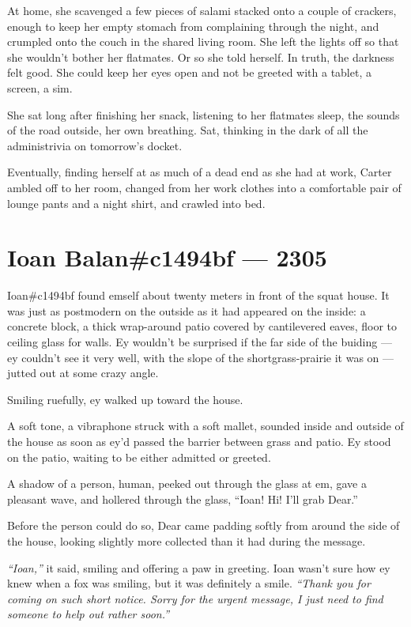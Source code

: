 At home, she scavenged a few pieces of salami stacked onto a couple of crackers, enough to keep her empty stomach from complaining through the night, and crumpled onto the couch in the shared living room. She left the lights off so that she wouldn't bother her flatmates. Or so she told herself. In truth, the darkness felt good. She could keep her eyes open and not be greeted with a tablet, a screen, a sim.

She sat long after finishing her snack, listening to her flatmates sleep, the sounds of the road outside, her own breathing. Sat, thinking in the dark of all the administrivia on tomorrow's docket.

Eventually, finding herself at as much of a dead end as she had at work, Carter ambled off to her room, changed from her work clothes into a comfortable pair of lounge pants and a night shirt, and crawled into bed.

\chapter*{Ioan Balan\#c1494bf — 2305}

\noindent Ioan\#c1494bf found emself about twenty meters in front of the squat house. It was just as postmodern on the outside as it had appeared on the inside: a concrete block, a thick wrap-around patio covered by cantilevered eaves, floor to ceiling glass for walls. Ey wouldn't be surprised if the far side of the buiding --- ey couldn't see it very well, with the slope of the shortgrass-prairie it was on --- jutted out at some crazy angle.

Smiling ruefully, ey walked up toward the house.

A soft tone, a vibraphone struck with a soft mallet, sounded inside and outside of the house as soon as ey'd passed the barrier between grass and patio. Ey stood on the patio, waiting to be either admitted or greeted.

A shadow of a person, human, peeked out through the glass at em, gave a pleasant wave, and hollered through the glass, ``Ioan! Hi! I'll grab Dear.''

Before the person could do so, Dear came padding softly from around the side of the house, looking slightly more collected than it had during the message.

\emph{``Ioan,''} it said, smiling and offering a paw in greeting. Ioan wasn't sure how ey knew when a fox was smiling, but it was definitely a smile. \emph{``Thank you for coming on such short notice. Sorry for the urgent message, I just need to find someone to help out rather soon.''}

